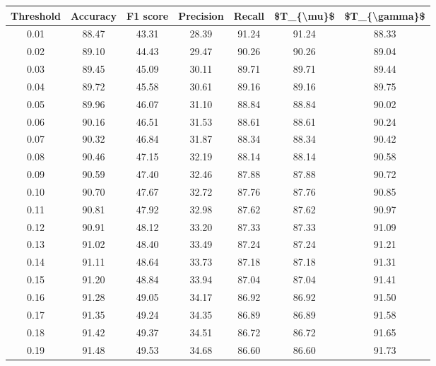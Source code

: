 \begin{tabular}{|c|c|c|c|c|c|c|}
\hline
 Threshold &  Accuracy &  F1 score &  Precision &  Recall &  \$T\_\{\textbackslash mu\}\$ &  \$T\_\{\textbackslash gamma\}\$ \\
\hline
      0.01 &     88.47 &     43.31 &      28.39 &   91.24 &      91.24 &         88.33 \\
      0.02 &     89.10 &     44.43 &      29.47 &   90.26 &      90.26 &         89.04 \\
      0.03 &     89.45 &     45.09 &      30.11 &   89.71 &      89.71 &         89.44 \\
      0.04 &     89.72 &     45.58 &      30.61 &   89.16 &      89.16 &         89.75 \\
      0.05 &     89.96 &     46.07 &      31.10 &   88.84 &      88.84 &         90.02 \\
      0.06 &     90.16 &     46.51 &      31.53 &   88.61 &      88.61 &         90.24 \\
      0.07 &     90.32 &     46.84 &      31.87 &   88.34 &      88.34 &         90.42 \\
      0.08 &     90.46 &     47.15 &      32.19 &   88.14 &      88.14 &         90.58 \\
      0.09 &     90.59 &     47.40 &      32.46 &   87.88 &      87.88 &         90.72 \\
      0.10 &     90.70 &     47.67 &      32.72 &   87.76 &      87.76 &         90.85 \\
      0.11 &     90.81 &     47.92 &      32.98 &   87.62 &      87.62 &         90.97 \\
      0.12 &     90.91 &     48.12 &      33.20 &   87.33 &      87.33 &         91.09 \\
      0.13 &     91.02 &     48.40 &      33.49 &   87.24 &      87.24 &         91.21 \\
      0.14 &     91.11 &     48.64 &      33.73 &   87.18 &      87.18 &         91.31 \\
      0.15 &     91.20 &     48.84 &      33.94 &   87.04 &      87.04 &         91.41 \\
      0.16 &     91.28 &     49.05 &      34.17 &   86.92 &      86.92 &         91.50 \\
      0.17 &     91.35 &     49.24 &      34.35 &   86.89 &      86.89 &         91.58 \\
      0.18 &     91.42 &     49.37 &      34.51 &   86.72 &      86.72 &         91.65 \\
      0.19 &     91.48 &     49.53 &      34.68 &   86.60 &      86.60 &         91.73 \\

\end{tabular}

